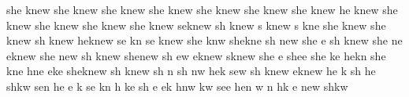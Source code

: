 she knew
she knew
she knew
she knew
she knew
she knew
she knew
\phantom{s}he knew
she knew
she knew
she knew
she knew
s\phantom{h}e\phantom{ }knew
sh\phantom{e} knew
s\phantom{h}\phantom{e} knew
s\phantom{h}\phantom{e} kne\phantom{w}
she knew
she knew
sh\phantom{e} knew
\phantom{s}he\phantom{ }knew
s\phantom{h}e kn\phantom{e}\phantom{w}
s\phantom{h}e knew
she kn\phantom{e}w
she\phantom{ }kne\phantom{w}
sh\phantom{e} \phantom{k}new
she \phantom{k}\phantom{n}e\phantom{w}
sh\phantom{e} knew
she \phantom{k}ne\phantom{w}
\phantom{s}\phantom{h}e\phantom{ }knew
she \phantom{k}new
sh\phantom{e} knew
she\phantom{ }\phantom{k}new
sh\phantom{e} \phantom{k}\phantom{n}ew
\phantom{s}\phantom{h}e\phantom{ }knew
s\phantom{h}\phantom{e}\phantom{ }knew
she \phantom{k}\phantom{n}e\phantom{w}
she\phantom{ }\phantom{k}\phantom{n}e\phantom{w}
she k\phantom{n}e\phantom{w}
\phantom{s}he\phantom{ }kn\phantom{e}\phantom{w}
she kne\phantom{w}
\phantom{s}h\phantom{e}\phantom{ }\phantom{k}ne\phantom{w}
\phantom{s}\phantom{h}e\phantom{ }k\phantom{n}e\phantom{w}
she\phantom{ }knew
sh\phantom{e} knew
sh\phantom{e} \phantom{k}n\phantom{e}\phantom{w}
sh\phantom{e} \phantom{k}n\phantom{e}w
\phantom{s}he\phantom{ }k\phantom{n}\phantom{e}\phantom{w}
s\phantom{h}\phantom{e}\phantom{ }\phantom{k}\phantom{n}ew
sh\phantom{e} knew
\phantom{s}\phantom{h}e\phantom{ }knew
\phantom{s}he k\phantom{n}\phantom{e}\phantom{w}
sh\phantom{e} \phantom{k}\phantom{n}\phantom{e}\phantom{w}
\phantom{s}h\phantom{e}\phantom{ }\phantom{k}\phantom{n}e\phantom{w}
sh\phantom{e}\phantom{ }k\phantom{n}\phantom{e}w
s\phantom{h}e\phantom{ }\phantom{k}n\phantom{e}\phantom{w}
\phantom{s}he \phantom{k}\phantom{n}e\phantom{w}
\phantom{s}\phantom{h}\phantom{e} k\phantom{n}\phantom{e}\phantom{w}
s\phantom{h}e kn\phantom{e}\phantom{w}
\phantom{s}h\phantom{e} k\phantom{n}e\phantom{w}
sh\phantom{e} \phantom{k}\phantom{n}e\phantom{w}
\phantom{s}\phantom{h}e\phantom{ }k\phantom{n}\phantom{e}\phantom{w}
\phantom{s}h\phantom{e}\phantom{ }\phantom{k}n\phantom{e}w
\phantom{s}\phantom{h}\phantom{e}\phantom{ }k\phantom{n}\phantom{e}w
s\phantom{h}e\phantom{ }\phantom{k}\phantom{n}e\phantom{w}
\phantom{s}he\phantom{ }\phantom{k}n\phantom{e}\phantom{w}
\phantom{s}\phantom{h}\phantom{e} \phantom{k}\phantom{n}\phantom{e}\phantom{w}
\phantom{s}\phantom{h}\phantom{e}\phantom{ }\phantom{k}\phantom{n}\phantom{e}w
\phantom{s}\phantom{h}\phantom{e} \phantom{k}n\phantom{e}\phantom{w}
\phantom{s}h\phantom{e}\phantom{ }k\phantom{n}\phantom{e}\phantom{w}
\phantom{s}\phantom{h}e \phantom{k}new
sh\phantom{e}\phantom{ }k\phantom{n}\phantom{e}w
\phantom{s}\phantom{h}\phantom{e} \phantom{k}\phantom{n}\phantom{e}\phantom{w}

